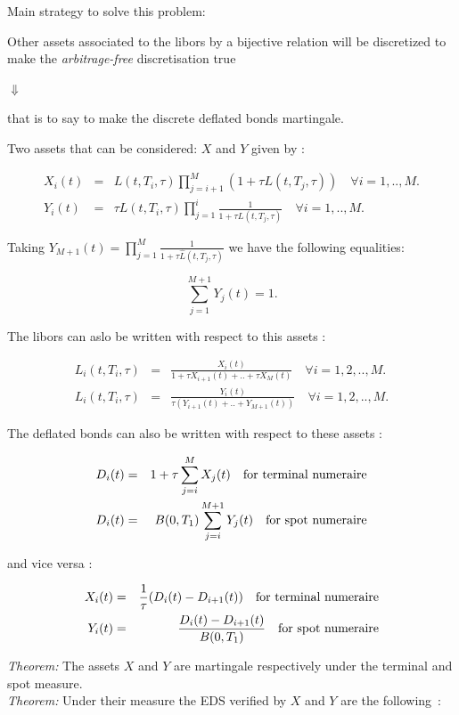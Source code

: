 \documentclass[10pt,a4paper,english,landscape]{slides}
\newcommand{\ba}{\begin{eqnarray}}
\newcommand{\ea}{\end{eqnarray}}
\begin{document}
Main strategy to solve this problem:



\begin{center}
Other assets associated to the libors by a bijective relation will be discretized to make the {\it arbitrage-free} discretisation true

$\Downarrow$

that is to say to make the discrete deflated bonds martingale.
\end{center}

Two assets that can be considered: $X$ and $Y$ given by :

\ba
\label{XfL}
X_i(t)&=&L(t,T_i,\tau)\prod_{j=i+1}^{M}\left(1+\tau
  {L}(t,T_j,\tau)\right) \quad \forall i=1,..,M.\\
\label{YfL}
Y_i(t)&=&\tau L(t,T_i,\tau)\prod_{j=1}^{i}\frac{1}{1+\tau
  {L}(t,T_j,\tau)} \quad \forall i=1,..,M.
\ea

Taking $Y_{M+1}(t)=\prod_{j=1}^{M}\frac{1}{1+\tau   \hat{L}(t,T_j,\tau)}$ we have the following equalities:

\begin{equation}
\sum_{j=1}^{M+1} Y_j(t) = 1.
\end{equation}

The libors can aslo be written with respect to this assets :

\ba
\label{LfX}
L_i(t,T_i,\tau)&=&\frac{X_i(t)}{1+\tau X_{i+1}(t)+..+\tau X_M(t)} \quad \forall i=1,2,..,M.\\
\label{LfY}
L_i(t,T_i,\tau)&=&\frac{Y_i(t)}{\tau (Y_{i+1}(t)+..+Y_{M+1}(t))} \quad \forall i=1,2,..,M.
\ea

The deflated bonds  can also be written with respect to these assets :

\ba
\label{DtfX}
D_i(t)&=&1+\tau \sum_{j=i}^{M}X_j(t) \quad \hbox{for terminal numeraire}\\
\label{DsfY}
D_i(t)&=&B(0,T_1)\sum_{j=i}^{M+1}Y_j(t) \quad \hbox{for spot numeraire}
\ea

and vice versa :

\ba
\label{XfD}
X_i(t)&=&\frac{1}{\tau}(D_i(t)-D_{i+1}(t)) \quad \hbox{for terminal numeraire}\\
\label{YfD}
Y_i(t)&=& \frac{D_i(t)-D_{i+1}(t)}{B(0,T_1)}\quad \hbox{for spot numeraire}
\ea

{\it Theorem:} The assets $X$ and $Y$ are martingale respectively under the terminal and spot measure.\\


{\it Theorem:} Under their measure the EDS verified by $X$ and $Y$ are the following~:
\end{document}
